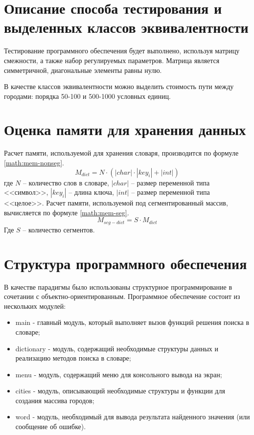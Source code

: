 \section{Описание способа тестирования и выделенных классов эквивалентности}
Тестирование программного обеспечения будет выполнено, используя матрицу смежности, а также набор регулируемых параметров. Матрица является симметричной, диагональные элементы равны нулю.

В качестве классов эквивалентности можно выделить стоимость пути между городами: порядка 50-100 и 500-1000 условных единиц.

\section{Оценка памяти для хранения данных}

Расчет памяти, используемой для хранения словаря, производится по формуле \ref{math:mem-nonseg}.
\begin{equation}\label{math:mem-nonseg}
	M_{dict} = N \cdot (|char| \cdot |key_i| + |int|)
\end{equation}
где $N$ -- количество слов в словаре, $|char|$ -- размер переменной типа <<символ>>, $|key_i|$ -- длина ключа, $|int|$ --  размер переменной типа <<целое>>.
Расчет памяти, используемой под сегментированный массив, вычисляется по формуле \ref{math:mem-seg}.
\begin{equation}\label{math:mem-seg}
	M_{seg-dict} = S \cdot M_{dict}
\end{equation}
Где $S$ -- количество сегментов.

\section{Структура программного обеспечения}
В качестве парадигмы было использованы структурное программирование в сочетании с объектно-ориентированным. Программное обеспечение состоит из нескольких модулей:
\begin{itemize}
	\item main - главный модуль, который выполняет вызов функций решения поиска в  словаре;
	\item dictionary - модуль, содержащий необходимые структуры данных и реализацию методов поиска в словаре;
	\item menu - модуль, содержащий меню для консольного вывода на экран;
	\item cities - модуль, описывающий необходимые структуры и функции для создания массива городов;
	\item word - модуль, необходимый для вывода результата найденного значения (или сообщение об ошибке).
\end{itemize}

